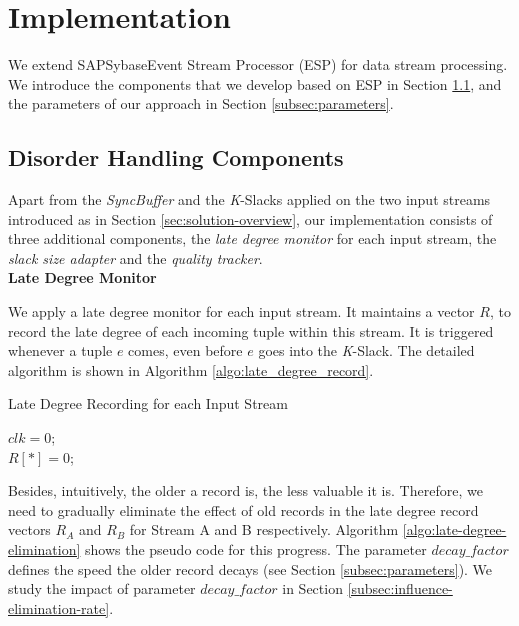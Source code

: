 \documentclass[a4paper, 11pt, twoside]{report}
\begin{document}
\section{Implementation}
\label{sec:implementation}

We extend SAP\textregistered{ }Sybase\textregistered{ }Event Stream Processor (ESP)\cite{ESP} for data stream processing. We introduce the components that we develop based on ESP in Section \ref{subsec:disorder handling components}, and the parameters of our approach in Section \ref{subsec:parameters}. \\

\subsection{Disorder Handling Components}
\label{subsec:disorder handling components}
Apart from the \textit{SyncBuffer} and the \textit{K}-Slacks applied on the two input streams introduced as in Section \ref{sec:solution-overview}, our implementation consists of three additional components, the \textit{late degree monitor} for each input stream, the \textit{slack size adapter} and the \textit{quality tracker}.\\

\noindent\textbf{Late Degree Monitor}\\
\label{subsec:late-degree-monitor}

We apply a late degree monitor for each input stream. It maintains a vector $R$, to record the late degree of each incoming tuple within this stream. It is triggered whenever a tuple $e$ comes, even before $e$ goes into the \textit{K}-Slack. The detailed algorithm is shown in Algorithm \ref{algo:late_degree_record}.\\

\begin{algorithm}[H]
\caption{Late Degree Recording for each Input Stream\label{algo:late_degree_record}}
$clk = 0$;\\
$R[*]= 0$;\\
\end{algorithm}

\hspace{15pt}

Besides, intuitively, the older a record is, the less valuable it is. Therefore, we need to gradually eliminate the effect of old records in the late degree record vectors $R_A$ and $R_B$ for Stream A and B respectively. Algorithm \ref{algo:late-degree-elimination} shows the pseudo code for this progress. The parameter $decay\_factor$ defines the speed the older record decays (see Section \ref{subsec:parameters}). We study the impact of parameter $decay\_factor$ in Section \ref{subsec:influence-elimination-rate}.\\
\end{document}
